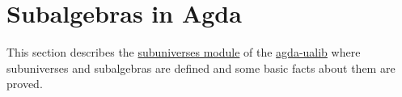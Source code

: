 \documentclass[sigplan,screen]{acmart}
\newcommand\subuniversesmodule{\href{https://gitlab.com/ualib/ualib.gitlab.io/-/blob/master/subuniverses.lagda.rst}{subuniverses module}\xspace}
\newcommand{\agdaualib}{\href{https://ualib.org}{agda-ualib}\xspace}
\newcommand{\agdaualib}{\href{anonymizedLink/agda-ualib.html}{agda-ualib}\xspace}
\newcommand\subuniversesmodule{\href{anonymizedLink/subuniverses.lagda.rst}{subuniverses module}\xspace}
\begin{document}
\begin{comment}
  \subsection{Compatibility of terms}\label{compatibility-of-terms}
  In this section we present the formal proof of the fact that homomorphisms commute with terms. More precisely, if 𝑨 and 𝑩 are 𝑆-algebras, h : 𝑨 → 𝑩 a homomorphism, and t a term in the language of 𝑆, then for all a : X → ∣ 𝑨 ∣ we have \(h (t^{𝑨} a) = t^{𝑩} (h ∘ a)\).

  \subsubsection{Homomorphisms commute with terms}\label{homomorphisms-commute-with-terms}

  \begin{code}\end{code}


  \subsubsection{Congruences commute with terms}\label{congruences-commute-with-terms}

  Rounding out this section is an formal proof of the fact that terms respect congruences. More precisely, we show that for every term \texttt{t}, every \texttt{θ\ ∈\ Con(𝑨)}, and all tuples \texttt{a,\ b\ :\ 𝑋\ →\ A}, we have


  TODO

\end{comment}

\section{Subalgebras in Agda}\label{subalgebras-in-agda}
This section describes the \subuniversesmodule of the \agdaualib where subuniverses and subalgebras are defined and some basic facts about them are proved.

\end{document}
